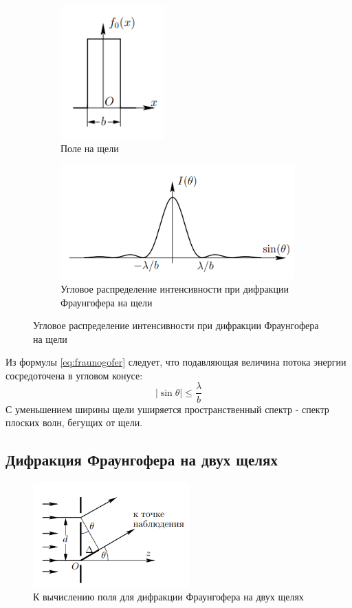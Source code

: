 \begin{figure}[h!]
    \centering
    \begin{subfigure}{0.38\linewidth}
        \centering
        \includegraphics[width=4cm]{images/fraungofer_1.png}
        \caption{Поле на щели}
    \end{subfigure}
    \hfill
    \begin{subfigure}{0.6\linewidth}
        \centering
        \includegraphics[width=9cm]{images/fraungofer_2.png}
        \caption{Угловое распределение интенсивности при дифракции Фраунгофера на щели}
    \end{subfigure}
\end{figure}

\indent Из формулы \ref{eq:fraunogofer} следует, что подавляющая величина потока энергии сосредоточена  в угловом конусе:
\begin{equation}
    |\sin\theta| \le \frac{\lambda}{b}
\end{equation}
С уменьшением ширины щели уширяется пространственный спектр - спектр плоских волн, бегущих от щели.

\subsection*{Дифракция Фраунгофера на двух щелях}

\begin{figure}
    \centering
    \includegraphics[width=6cm]{images/fraungofer_theory.png}
    \caption{К вычислению поля для дифракции Фраунгофера на двух щелях}
\end{figure}

